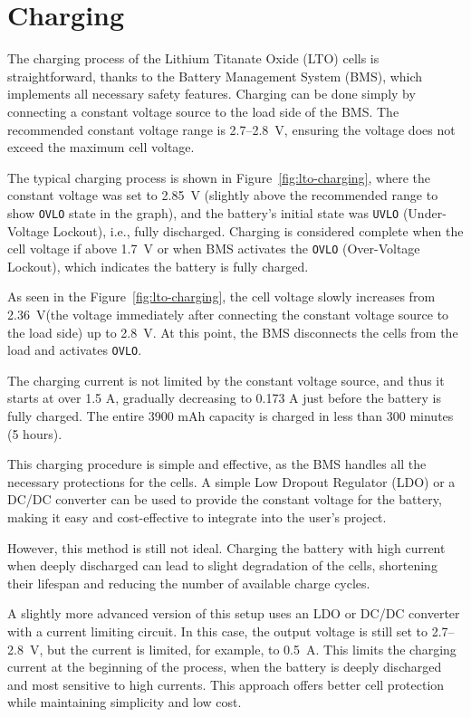 \documentclass[11pt]{datasheet}
\begin{document}
\section{Charging}

The charging process of the Lithium Titanate Oxide (LTO) cells is
straightforward, thanks to the Battery Management System (BMS), which
implements all necessary safety features. Charging can be done simply by
connecting a constant voltage source to the load side of the BMS. The
recommended constant voltage range is 2.7--2.8~V, ensuring the voltage does not
exceed the maximum cell voltage.

The typical charging process is shown in Figure~\ref{fig:lto-charging}, where
the constant voltage was set to 2.85~V (slightly above the recommended range to
show \texttt{OVLO} state in the graph), and the battery's initial state
was \texttt{UVLO} (Under-Voltage Lockout), i.e., fully discharged. Charging is
considered complete when the cell voltage if above 1.7~V or when BMS activates
the \texttt{OVLO} (Over-Voltage Lockout), which indicates the battery is fully
charged.

As seen in the Figure~\ref{fig:lto-charging}, the cell voltage slowly increases
from 2.36~V(the voltage immediately after connecting the constant voltage
source to the load side) up to 2.8~V. At this point, the BMS disconnects the
cells from the load and activates \texttt{OVLO}.

The charging current is not limited by the constant voltage source, and thus it
starts at over 1.5 A, gradually decreasing to 0.173 A just before the battery
is fully charged. The entire 3900 mAh capacity is charged in less than 300
minutes (5 hours).

This charging procedure is simple and effective, as the BMS handles all the
necessary protections for the cells. A simple Low Dropout Regulator (LDO) or a
DC/DC converter can be used to provide the constant voltage for the battery,
making it easy and cost-effective to integrate into the user's project.

However, this method is still not ideal. Charging the battery with high current
when deeply discharged can lead to slight degradation of the cells, shortening
their lifespan and reducing the number of available charge cycles.

A slightly more advanced version of this setup uses an LDO or DC/DC converter
with a current limiting circuit. In this case, the output voltage is still set
to 2.7--2.8~V, but the current is limited, for example, to 0.5~A. This limits
the charging current at the beginning of the process, when the battery is
deeply discharged and most sensitive to high currents. This approach offers
better cell protection while maintaining simplicity and low cost.
\end{document}
